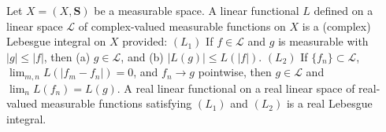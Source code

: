 Let $X = (X, \mathbf{S})$ be a measurable space. A linear functional $L$ defined on a linear space $\mathcal{L}$ of complex-valued measurable functions on $X$ is a (complex) Lebesgue integral on $X$ provided:
$(L_1)$ If $f \in \mathcal{L}$ and $g$ is measurable with $|g| \leq |f|$, then (a) $g \in \mathcal{L}$, and (b) $|L(g)| \leq L(|f|)$.
$(L_2)$ If $\{f_n\} \subset \mathcal{L}$, $\lim_{m,n} L(|f_m - f_n|) = 0$, and $f_n \to g$ pointwise, then $g \in \mathcal{L}$ and $\lim_n L(f_n) = L(g)$.
A real linear functional on a real linear space of real-valued measurable functions satisfying $(L_1)$ and $(L_2)$ is a real Lebesgue integral.
